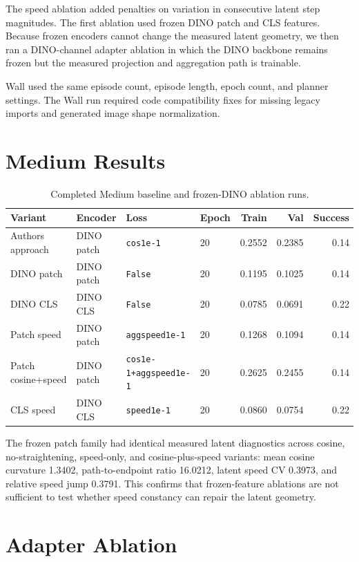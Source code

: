 \documentclass[11pt]{article}
\begin{document}
The speed ablation added penalties on variation in consecutive latent step magnitudes. The first ablation used frozen DINO patch and CLS features. Because frozen encoders cannot change the measured latent geometry, we then ran a DINO-channel adapter ablation in which the DINO backbone remains frozen but the measured projection and aggregation path is trainable.

Wall used the same episode count, episode length, epoch count, and planner settings. The Wall run required code compatibility fixes for missing legacy imports and generated image shape normalization.

\section{Medium Results}

\begin{table}[h]
\centering
\small
\begin{tabular}{llllrrr}
\toprule
Variant & Encoder & Loss & Epoch & Train & Val & Success \\
\midrule
Authors approach & DINO patch & \texttt{cos1e-1} & 20 & 0.2552 & 0.2385 & 0.14 \\
DINO patch & DINO patch & \texttt{False} & 20 & 0.1195 & 0.1025 & 0.14 \\
DINO CLS & DINO CLS & \texttt{False} & 20 & 0.0785 & 0.0691 & 0.22 \\
Patch speed & DINO patch & \texttt{aggspeed1e-1} & 20 & 0.1268 & 0.1094 & 0.14 \\
Patch cosine+speed & DINO patch & \texttt{cos1e-1+aggspeed1e-1} & 20 & 0.2625 & 0.2455 & 0.14 \\
CLS speed & DINO CLS & \texttt{speed1e-1} & 20 & 0.0860 & 0.0754 & 0.22 \\
\bottomrule
\end{tabular}
\caption{Completed Medium baseline and frozen-DINO ablation runs.}
\end{table}

The frozen patch family had identical measured latent diagnostics across cosine, no-straightening, speed-only, and cosine-plus-speed variants: mean cosine curvature 1.3402, path-to-endpoint ratio 16.0212, latent speed CV 0.3973, and relative speed jump 0.3791. This confirms that frozen-feature ablations are not sufficient to test whether speed constancy can repair the latent geometry.

\section{Adapter Ablation}
\end{document}
